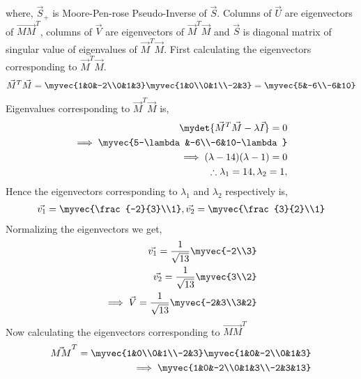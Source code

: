 where, $\vec{S}_+$ is Moore-Pen-rose Pseudo-Inverse of $\vec{S}$. Columns of $\vec{U}$ are eigenvectors of $\vec{MM}^T$, columns of $\vec{V}$ are eigenvectors of $\vec{M}^T\vec{M}$ and $\vec{S}$ is diagonal matrix of singular value of eigenvalues of $\vec{M}^T\vec{M}$. First calculating the eigenvectors corresponding to $\vec{M}^T\vec{M}$.
\begin{align}
\vec{M}^T\vec{M} =  \myvec{1&0&-2\\0&1&3} \myvec{1&0\\0&1\\-2&3} = \myvec{5&-6\\-6&10}
\end{align}
Eigenvalues corresponding to $\vec{M}^T\vec{M}$  is,
\begin{align}
\mydet{\vec{M}^T\vec{M}-\lambda\vec{I}} = 0\\
\implies \myvec{5-\lambda&-6\\-6&10-\lambda}\\
\implies (\lambda-14)(\lambda-1) = 0\\
\therefore \lambda_1 = 14, \lambda_2 = 1, \label{eq:solutions/4/45/2/2/eq:lambda2}
\end{align} 
Hence the eigenvectors corresponding to $\lambda_1$ and $\lambda_2$ respectively is,
\begin{align}
\vec{v_1} =\myvec{\frac{-2}{3}\\1}, \vec{v_2} =\myvec{\frac{3}{2}\\1}
\end{align}
Normalizing the eigenvectors we get,
\begin{align}
\vec{v_1} = \frac{1}{\sqrt{13}}\myvec{-2\\3}\\
\vec{v_2} = \frac{1}{\sqrt{13}}\myvec{3\\2}\\
\implies \vec{V} = \frac{1}{\sqrt{13}}\myvec{-2&3\\3&2}\label{eq:solutions/4/45/2/2/eq:V}
\end{align}
Now calculating the eigenvectors corresponding to $\vec{MM}^T$
\begin{align}
\vec{MM}^T = \myvec{1&0\\0&1\\-2&3}\myvec{1&0&-2\\0&1&3} \\\implies \myvec{1&0&-2\\0&1&3\\-2&3&13}
\end{align}
